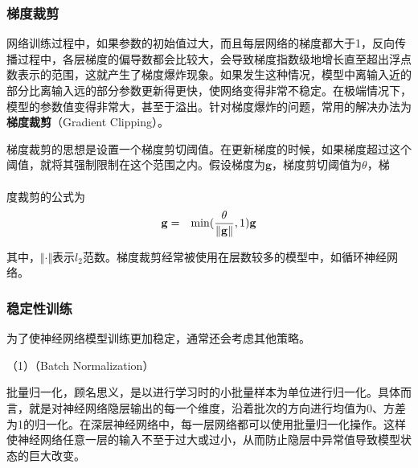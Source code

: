 
\subsubsection{梯度裁剪}

\parinterval  网络训练过程中，如果参数的初始值过大，而且每层网络的梯度都大于1，反向传播过程中，各层梯度的偏导数都会比较大，会导致梯度指数级地增长直至超出浮点数表示的范围，这就产生了梯度爆炸现象。如果发生这种情况，模型中离输入近的部分比离输入远的部分参数更新得更快，使网络变得非常不稳定。在极端情况下，模型的参数值变得非常大，甚至于溢出。针对梯度爆炸的问题，常用的解决办法为{\small\sffamily\bfseries{梯度裁剪}}（Gradient Clipping）。

\parinterval    梯度裁剪的思想是设置一个梯度剪切阈值。在更新梯度的时候，如果梯度超过这个阈值，就将其强制限制在这个范围之内。假设梯度为$ \mathbf g $，梯度剪切阈值为$ \theta $，梯\\ \\度裁剪的公式为
\begin{eqnarray}
\mathbf g&=&{\rm{min}}(\frac{\theta}{\Vert \mathbf g\Vert},1)\mathbf g
\label{eq:5-43}
\end{eqnarray}

\noindent 其中，$ \Vert \cdot \Vert $表示$ l_2 $范数。梯度裁剪经常被使用在层数较多的模型中，如循环神经网络。


\subsubsection{稳定性训练}

\parinterval  为了使神经网络模型训练更加稳定，通常还会考虑其他策略。

\parinterval  （1）{\small{}}（Batch Normalization）

\parinterval  批量归一化，顾名思义，是以进行学习时的小批量样本为单位进行归一化\cite{ioffe2015batch}。具体而言，就是对神经网络隐层输出的每一个维度，沿着批次的方向进行均值为0、方差为1的归一化。在深层神经网络中，每一层网络都可以使用批量归一化操作。这样使神经网络任意一层的输入不至于过大或过小，从而防止隐层中异常值导致模型状态的巨大改变。


